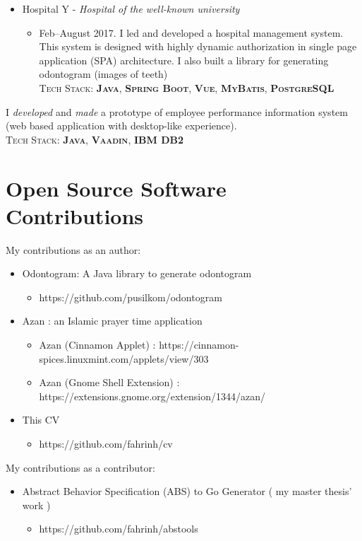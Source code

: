 \documentclass[11pt,a4paper,sans]{moderncv} %
\begin{document}
{\begin{itemize}
\begin{itemize}
  \end{itemize}
  \item Hospital Y - \textit{Hospital of the well-known university}
  \begin{itemize}
      \item Feb--August 2017. I led and developed a hospital management system. This system is designed with highly dynamic authorization in single page application (SPA) architecture. I also built a library for generating odontogram (images of teeth)\\ \textsc{Tech Stack: \textbf{Java}, \textbf{Spring Boot}, \textbf{Vue}, \textbf{MyBatis}, \textbf{PostgreSQL}}
  \end{itemize}
\end{itemize}
}

{
I \textit{developed} and \textit{made} a prototype of employee performance information system (web based application with desktop-like experience).\\
\textsc{Tech Stack: \textbf{Java}, \textbf{Vaadin}, \textbf{IBM DB2}}
}

\section{Open Source Software Contributions}
{
My contributions as an author:
\begin{itemize}
    \item Odontogram: A Java library to generate odontogram
      \begin{itemize}
        \item https://github.com/pusilkom/odontogram
      \end{itemize}
    \item Azan : an Islamic prayer time application
      \begin{itemize}
        \item Azan (Cinnamon Applet) : https://cinnamon-spices.linuxmint.com/applets/view/303
        \item Azan (Gnome Shell Extension) : https://extensions.gnome.org/extension/1344/azan/
      \end{itemize}
    \item This CV
      \begin{itemize}
        \item https://github.com/fahrinh/cv
      \end{itemize}
 \end{itemize}
}
{
My contributions as a contributor:
\begin{itemize}
    \item Abstract Behavior Specification (ABS) to Go Generator ( my master thesis' work )
    \begin{itemize}
        \item https://github.com/fahrinh/abstools
    \end{itemize}
\end{itemize}
}
\end{document}
